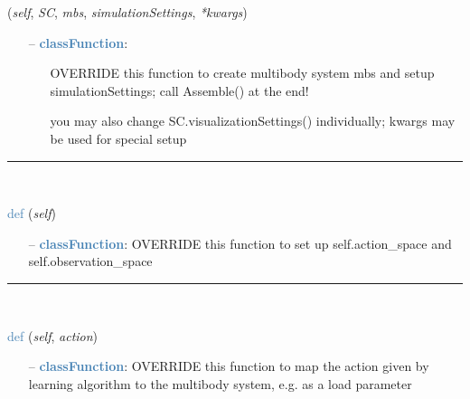 \begin{itemize}[leftmargin=1.4cm]
\begin{flushleft}
({\it self}, {\it SC}, {\it mbs}, {\it simulationSettings}, {\it **kwargs})
\end{flushleft}
\setlength{\itemindent}{0.7cm}
\begin{itemize}[leftmargin=0.7cm]
  \item[--]  \textcolor{steelblue}{\bf classFunction}: \vspace{-6pt}
  \begin{itemize}[leftmargin=1.2cm]
\setlength{\itemindent}{-0.7cm}
    \item[] OVERRIDE this function to create multibody system mbs and setup simulationSettings; call Assemble() at the end!
    \item[]                  you may also change SC.visualizationSettings() individually; kwargs may be used for special setup
  \end{itemize}
\vspace{12pt}\end{itemize}
%
\noindent\rule{8cm}{0.75pt}\vspace{1pt} \\ 
\begin{flushleft}
\noindent \textcolor{steelblue}{def {\bf {}}}\label{sec:artificialIntelligence:OpenAIGymInterfaceEnv:SetupSpaces}
({\it self})
\end{flushleft}
\setlength{\itemindent}{0.7cm}
\begin{itemize}[leftmargin=0.7cm]
  \item[--]  \textcolor{steelblue}{\bf classFunction}: OVERRIDE this function to set up self.action\_space and self.observation\_space\vspace{12pt}\end{itemize}
%
\noindent\rule{8cm}{0.75pt}\vspace{1pt} \\ 
\begin{flushleft}
\noindent \textcolor{steelblue}{def {\bf {}}}\label{sec:artificialIntelligence:OpenAIGymInterfaceEnv:MapAction2MBS}
({\it self}, {\it action})
\end{flushleft}
\setlength{\itemindent}{0.7cm}
\begin{itemize}[leftmargin=0.7cm]
  \item[--]  \textcolor{steelblue}{\bf classFunction}: OVERRIDE this function to map the action given by learning algorithm to the multibody system, e.g. as a load parameter\vspace{12pt}\end{itemize}

\end{itemize}
